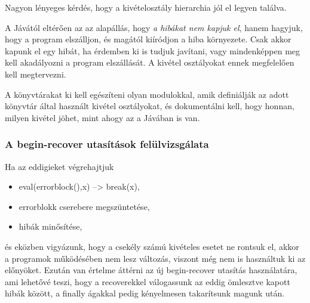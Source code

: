 Nagyon lényeges kérdés, hogy a kivételosztály hierarchia jól 
el legyen  találva.  

A Jávától eltérően az az alapállás, hogy {\em a hibákat nem kapjuk el},
hanem hagyjuk, hogy a program elszálljon, és magától kiíródjon a hiba 
környezete. Csak akkor kapunk el egy hibát, ha érdemben ki is tudjuk 
javítani, vagy mindenképpen meg kell akadályozni a program elszállását. 
A kivétel osztályokat ennek megfelelően kell megtervezni.

A könyvtárakat ki kell egészíteni olyan modulokkal, amik definiálják 
az adott könyvtár által használt kivétel osztályokat, és dokumentálni kell, 
hogy honnan, milyen kivétel jöhet, mint ahogy az a Jávában is van.


\subsubsection{A begin-recover utasítások felülvizsgálata}

Ha az eddigieket végrehajtjuk
\begin{itemize}
\item eval(errorblock(),x) --> break(x),
\item errorblokk cserebere megszüntetése,
\item hibák minősítése,
\end{itemize}
és eközben vigyázunk, hogy a csekély számú kivételes esetet 
ne rontsuk el, akkor a programok működésében nem lesz változás,
viszont még nem is használtuk ki az előnyöket.
Ezután van értelme áttérni az új begin-recover utasítás használatára, 
ami lehetővé teszi, hogy a recoverekkel válogassunk az eddig ömlesztve 
kapott hibák között, a finally ágakkal pedig kényelmesen 
takarítsunk magunk után.

